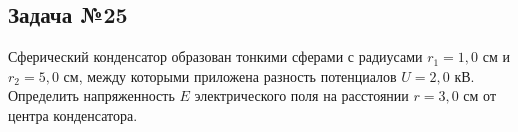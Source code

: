 \subsection{Задача №25}

Сферический конденсатор образован тонкими сферами с радиусами $r_1=1,0$ см и $r_2=5,0$ см, между которыми приложена разность потенциалов  $U=2,0$ кВ. Определить напряженность $E$ электрического поля на расстоянии $r=3,0$ см от центра конденсатора.